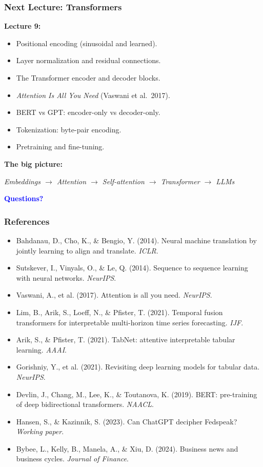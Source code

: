 \documentclass[notes,11pt, aspectratio=169]{beamer}
\begin{document}
\begin{frame}
\frametitle{Next Lecture: Transformers}

\textbf{Lecture 9:}
\begin{itemize}
    \item Positional encoding (sinusoidal and learned).
    \item Layer normalization and residual connections.
    \item The Transformer encoder and decoder blocks.
    \item \emph{Attention Is All You Need} (Vaswani et al.\ 2017).
    \item BERT vs GPT: encoder-only vs decoder-only.
    \item Tokenization: byte-pair encoding.
    \item Pretraining and fine-tuning.
\end{itemize}

\vspace{8pt}
\textbf{The big picture:}
\begin{center}
\textit{Embeddings $\to$ Attention $\to$ Self-attention $\to$ Transformer $\to$ LLMs}
\end{center}

\vspace{12pt}
\begin{center}
\Large \textcolor{blue}{\textbf{Questions?}}
\end{center}
\end{frame}

\begin{frame}
\frametitle{References}

\footnotesize
\begin{itemize}
    \item Bahdanau, D., Cho, K., \& Bengio, Y. (2014). Neural machine translation by jointly learning to align and translate. \textit{ICLR}.
    \item Sutskever, I., Vinyals, O., \& Le, Q. (2014). Sequence to sequence learning with neural networks. \textit{NeurIPS}.
    \item Vaswani, A., et al. (2017). Attention is all you need. \textit{NeurIPS}.
    \item Lim, B., Arik, S., Loeff, N., \& Pfister, T. (2021). Temporal fusion transformers for interpretable multi-horizon time series forecasting. \textit{IJF}.
    \item Arik, S., \& Pfister, T. (2021). TabNet: attentive interpretable tabular learning. \textit{AAAI}.
    \item Gorishniy, Y., et al. (2021). Revisiting deep learning models for tabular data. \textit{NeurIPS}.
    \item Devlin, J., Chang, M., Lee, K., \& Toutanova, K. (2019). BERT: pre-training of deep bidirectional transformers. \textit{NAACL}.
    \item Hansen, S., \& Kazinnik, S. (2023). Can ChatGPT decipher Fedspeak? \textit{Working paper}.
    \item Bybee, L., Kelly, B., Manela, A., \& Xiu, D. (2024). Business news and business cycles. \textit{Journal of Finance}.
\end{itemize}
\end{frame}
\end{document}
